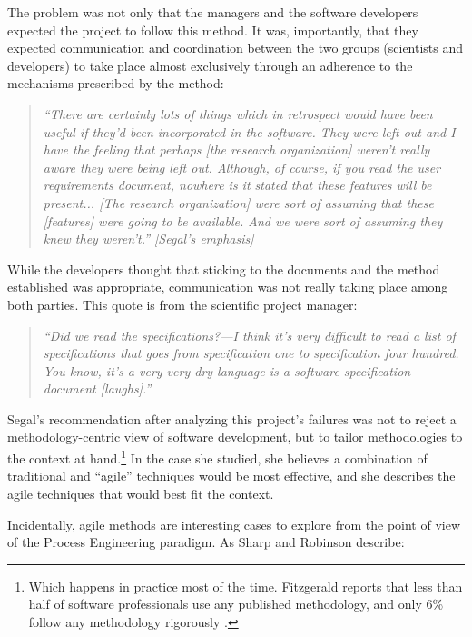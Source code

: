 The problem was not only that the managers and the software developers expected the project to follow this method. It was, importantly, that they expected communication and coordination between the two groups (scientists and developers) to take place almost exclusively through an adherence to the mechanisms prescribed by the method:

\begin{quote}
\emph{``There are certainly lots of things which in retrospect would have been useful if they'd been incorporated in the software. They were left out and I have the feeling that perhaps [the research organization] weren't really aware they were being left out. \emph{Although, of course, if you read the user requirements document, nowhere is it stated that these features will be present... [The research organization] were sort of assuming that these [features] were going to be available. And we were sort of assuming they knew they weren't.''} [Segal's emphasis]}
\end{quote}

While the developers thought that sticking to the documents and the method established was appropriate, communication was not really taking place among both parties. This quote is from the scientific project manager:

\begin{quote}
\emph{``Did we read the specifications?---I think it's very difficult to read a list of specifications that goes from specification one to specification four hundred. You know, it's a very very dry language is a software specification document [laughs].''}
\end{quote}

Segal's recommendation after analyzing this project's failures was not to reject a methodology-centric view of software development, but to tailor methodologies to the context at hand.\footnote{Which happens in practice most of the time. Fitzgerald reports that less than half of software professionals use any published methodology, and only 6\% follow any methodology rigorously \cite{Fitzgerald1998}.} In the case she studied, she believes a combination of traditional and ``agile'' techniques would be most effective, and she describes the agile techniques that would best fit the context.

Incidentally, agile methods are interesting cases to explore from the point of view of the Process Engineering paradigm. As Sharp and Robinson  describe:

